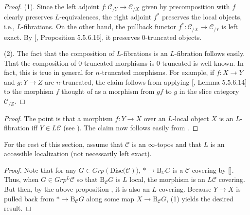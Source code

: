 \begin{proof}
    (1). Since the left adjoint $f: \mathcal{C}_{/Y}\to \mathcal{C}_{/X}$ given by precomposition with $f$ clearly preserves $L$-equivalences, the right adjoint $f^*$ preserves the local objects, i.e., $L$-fibrations. On the other hand, the pullback functor $f^*: \mathcal{C}_{/X}\to \mathcal{C}_{/Y}$ is left exact. By [\cite{lurie2009higher}, Proposition 5.5.6.16], it preserves $0$-truncated objects.  
    
    (2). The fact that the composition of $L$-fibrations is an $L$-fibration follows easily. That the composition of $0$-truncated morphisms is $0$-truncated is well known. In fact, this is true in general for $n$-truncated morphisms. For example, if $f: X\to Y$ and $g:Y\to Z$ are $n$-truncated, the claim follows from applying [\cite{lurie2009higher}, Lemma 5.5.6.14] to the morphism $f$ thought of as a morphism from $gf$ to $g$ in the slice category $\mathcal{C}_{/Z}$.
    \end{proof}
\begin{proof}
    The point is that a morphism $f:Y\to X$ over an $L$-local object $X$ is an $L$-fibration iff $Y\in L\mathcal{C}$ (see ). The claim now follows easily from .
\end{proof} 
For the rest of this section, assume that $\mathcal{C}$ is an $\infty$-topos and that $L$ is an accessible localization (not necessarily left exact).
\begin{proof}
    Note that for any $G\in Grp(\mathrm{Disc}{(\mathcal{C}}))$, $*\to \mathrm{B}_\mathcal{C}G$ is a $\mathcal{C}$ covering by []. Thus, when $G\in Grp^L\mathcal{C}$ so that $\mathrm{B}_\mathcal{C}G$ is $L$ local, the morphism is an $L\mathcal{C}$ covering. But then, by the above proposition , it is also an $L$ covering. Because $Y\to X$ is pulled back from $*\to \mathrm{B}_\mathcal{C}G$ along some map $X\to \mathrm{B}_\mathcal{C}G$,  (1) yields the desired result.
\end{proof}


